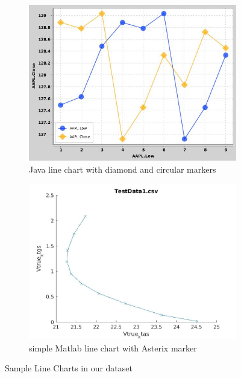\documentclass[12pt, a4paper,oneside]{report}
\begin{document}
\begin{figure}[!htbp]
	\begin{subfigure}{.5\textwidth}
		\centering
		\includegraphics[width=.8\linewidth]{line1}
		\caption{Java line chart with diamond and circular markers }
		\label{fig:line1}
	\end{subfigure}%
	\begin{subfigure}{.5\textwidth}
		\centering
		\includegraphics[width=.8\linewidth]{line2}
		\caption{simple Matlab line chart with Asterix marker}
		\label{fig:line2}
	\end{subfigure}
	\caption{Sample Line Charts in our dataset}
	\label{fig:figline}
\end{figure}
\end{document}
